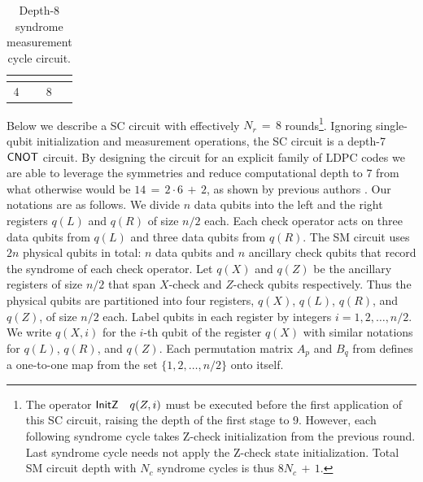 \documentclass{article}
\begin{document}
\begin{table}[ht]
\begin{center}
\begin{tabular}{c|c||c|c}
{\begin{minipage}{7cm}
\begin{algorithmic}
	\end{algorithmic}
\end{minipage}}
 \\
\hline
4 & 
{\centering
\begin{minipage}{7cm}
	\begin{algorithmic}
	\State{}
	\For{$i=1$ to $n/2$}
	\State{$\cnot{q(X,i)}{q(R,B_1(i))}$}
	\State{$\cnot{q(L,B_2^T(i))}{q(Z,i)}$}
	\EndFor
	\State{}
	\end{algorithmic}
\end{minipage}}
& 8 & 
{\centering
\begin{minipage}{7cm}
	\begin{algorithmic}
	\State{}
	\For{$i=1$ to $n/2$}
	\State{$\measX{q(X,i)}$}
	\State{$\initZ{q(Z,i)}$}
	\State{$\idle{q(L,i)}$}
	\State{$\idle{q(R,i)}$}
	\EndFor
	\State{}
	\end{algorithmic}
\end{minipage}}
\\
\hline
\end{tabular}
\end{center}
\caption{Depth-8 syndrome measurement cycle circuit.}
\label{table:syndromecircuit}
\end{table}



Below we describe a SC circuit with effectively $N_r\,{=}\,8$ rounds\footnote{The operator $\initZ{q(Z,i)}$ must be executed before the first application of this SC circuit, raising the depth of the first stage to 9.  However, each following syndrome cycle takes Z-check initialization from the previous round. Last syndrome cycle needs not apply the Z-check state initialization.  Total SM circuit depth with $N_c$ syndrome cycles is thus $8N_c\,{+}\,1$.}.  Ignoring single-qubit initialization and measurement operations, the SC circuit is a depth-7 $\mathsf{CNOT}$ circuit.  By designing the circuit for an explicit family of LDPC codes we are able to leverage the symmetries and reduce computational depth to $7$ from what otherwise would be $14\,{=}\,2{\cdot}6\,{+}\,2$, as shown by previous authors \cite[Theorem 1]{tremblay2022constant}.  Our notations are as follows.  We divide $n$ data qubits into the left and the right registers $q(L)$ and $q(R)$ of size $n/2$ each.  Each check operator acts on three data qubits from $q(L)$ and three data qubits from $q(R)$.  The SM circuit uses $2n$ physical qubits in total: $n$ data qubits and $n$ ancillary check qubits that record  the syndrome of each check operator.  Let $q(X)$ and $q(Z)$ be the ancillary registers of size $n/2$ that span $X$-check and $Z$-check qubits respectively.
Thus the physical qubits are partitioned into four registers,  $q(X)$, $q(L)$, $q(R)$, and $q(Z)$, of size $n/2$ each. Label qubits in each register by integers $i=1,2,\ldots,n/2$.
We write $q(X,i)$ for the $i$-th qubit of the register $q(X)$ with similar notations for $q(L)$, $q(R)$, and $q(Z)$.
Each permutation matrix $A_p$ and $B_q$ from  defines a one-to-one map from the set $\{1,2,\ldots,n/2\}$ onto itself.
\end{document}
